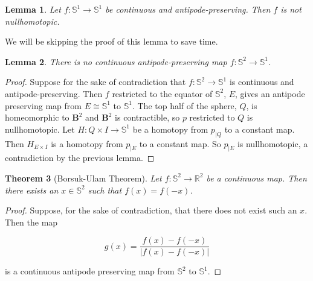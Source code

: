 \documentclass[a4paper]{article}
\newtheorem{theorem}{Theorem}
\newtheorem{lemma}[theorem]{Lemma}
\numberwithin{theorem}{section}
\begin{document}
\begin{lemma}
Let $f: \mathbb{S}^1 \rightarrow \mathbb{S}^1$ be continuous and antipode-preserving. Then $f$ is not nullhomotopic.
\end{lemma}
We will be skipping the proof of this lemma to save time.

\begin{lemma}
There is no continuous antipode-preserving map $f: \mathbb{S}^2 \rightarrow \mathbb{S}^1$.
\end{lemma}

\begin{proof}
Suppose for the sake of contradiction that $f: \mathbb{S}^2 \rightarrow \mathbb{S}^1$ is continuous and antipode-preserving. Then $f$ restricted to the equator of $\mathbb{S}^2$, $E$, gives an antipode preserving map from $E \cong \mathbb{S}^1$ to $\mathbb{S}^1$. The top half of the sphere, $Q$, is homeomorphic to $\textbf{B}^2$ and $\textbf{B}^2$ is contractible, so $p$ restricted to $Q$ is nullhomotopic. Let $H: Q \times I \rightarrow \mathbb{S}^1$ be a homotopy from $p_{|Q}$ to a constant map. Then $H_{E \times I}$ is a homotopy from $p_{|E}$ to a constant map. So $p_{|E}$ is nullhomotopic, a contradiction by the previous lemma.
\end{proof}

\begin{theorem}[Borsuk-Ulam Theorem]
Let $f: \mathbb{S}^2 \rightarrow \mathbb{R}^2$ be a continuous map. Then there exists an $x \in \mathbb{S}^2$ such that $f(x) = f(-x)$.
\end{theorem}

\begin{proof}
Suppose, for the sake of contradiction, that there does not exist such an $x$. Then the map

$$ g(x) = \frac{f(x)-f(-x)}{|f(x)-f(-x)|} $$

is a continuous antipode preserving map from $\mathbb{S}^2$ to $\mathbb{S}^1$.

\end{proof}
\end{document}
